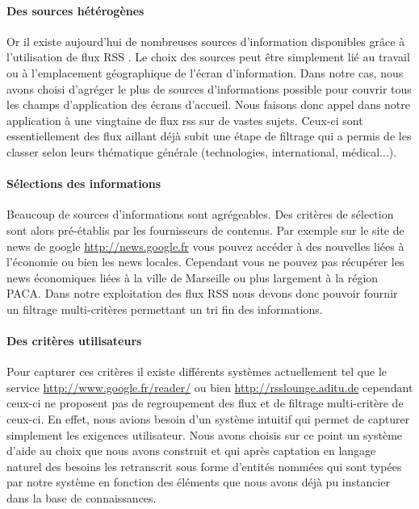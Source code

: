 \documentclass[]{easychair}
\begin{document}
\paragraph*{Des sources hétérogènes}
Or il existe aujourd'hui de nombreuses sources d'information disponibles grâce à l'utilisation de flux RSS \cite{RSS version 2.0 Specifications, http://blogs.law.harvard.edu/tech/rss, 2003.}. Le choix des sources peut être simplement lié au travail ou à l'emplacement géographique de l'écran d'information.
Dans notre cas, nous avons choisi d'agréger le plus de sources d'informations possible pour couvrir tous les champs d'application des écrans d'accueil. 
Nous faisons donc appel dans notre application à une vingtaine de flux rss sur de vastes sujets. Ceux-ci sont essentiellement des flux aillant déjà subit une étape de filtrage qui a permis de les classer selon leurs thématique générale (technologies, international, médical...).

\paragraph*{Sélections des informations}
Beaucoup de sources d'informations sont agrégeables. Des critères de sélection sont alors pré-établis par les fournisseurs de contenus.  Par exemple sur le site de news de google \url{http://news.google.fr} vous pouvez accéder à des nouvelles liées à l'économie ou bien les news locales. Cependant  vous ne pouvez pas récupérer les news économiques liées à la ville de Marseille ou plus largement à la région PACA. Dans notre exploitation des flux RSS nous devons donc pouvoir fournir un filtrage multi-critères permettant un tri fin des informations. 


\paragraph*{Des critères utilisateurs}

Pour capturer ces critères il existe différents systèmes actuellement tel que le service \url{http://www.google.fr/reader/} ou bien \url{http://rsslounge.aditu.de} cependant ceux-ci ne proposent pas de regroupement des flux et de filtrage multi-critère de ceux-ci.
En effet, nous avions besoin d'un système intuitif qui permet de capturer simplement les exigences utilisateur. Nous avons choisis sur ce point un système d'aide au choix que nous avons construit et qui après captation en langage naturel des besoins les retranscrit sous forme d'entités nommées qui sont typées par notre système en fonction des éléments que nous avons déjà pu instancier dans la base de connaissances.
\end{document}
